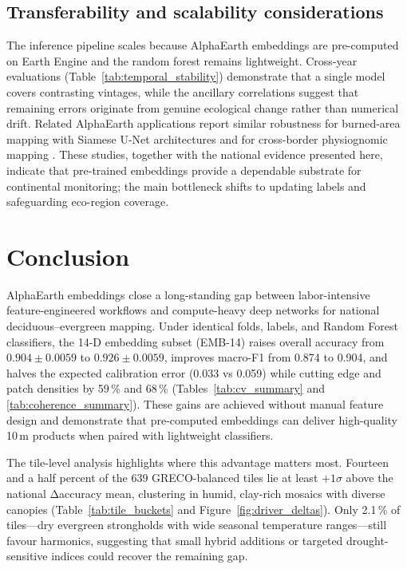 \documentclass[utf8]{FrontiersinHarvard}
\begin{document}
\subsection{Transferability and scalability considerations}
The inference pipeline scales because AlphaEarth embeddings are pre-computed on Earth Engine and the random forest remains lightweight. Cross-year evaluations (Table~\ref{tab:temporal_stability}) demonstrate that a single model covers contrasting vintages, while the ancillary correlations suggest that remaining errors originate from genuine ecological change rather than numerical drift. Related AlphaEarth applications report similar robustness for burned-area mapping with Siamese U-Net architectures \citep{Seydi2025AlphaEarthBurnedArea} and for cross-border physiognomic mapping \citep{Houriez2025AEFDataGen}. These studies, together with the national evidence presented here, indicate that pre-trained embeddings provide a dependable substrate for continental monitoring; the main bottleneck shifts to updating labels and safeguarding eco-region coverage.


\section{Conclusion}

AlphaEarth embeddings close a long-standing gap between labor-intensive feature-engineered workflows and compute-heavy deep networks for national deciduous–evergreen mapping. Under identical folds, labels, and Random Forest classifiers, the 14-D embedding subset (EMB-14) raises overall accuracy from $0.904 \pm 0.0059$ to $0.926 \pm 0.0059$, improves macro-F1 from 0.874 to 0.904, and halves the expected calibration error (0.033 vs 0.059) while cutting edge and patch densities by 59\,\% and 68\,\% (Tables~\ref{tab:cv_summary} and \ref{tab:coherence_summary}). These gains are achieved without manual feature design and demonstrate that pre-computed embeddings can deliver high-quality 10\,m products when paired with lightweight classifiers.

The tile-level analysis highlights where this advantage matters most. Fourteen and a half percent of the 639 GRECO-balanced tiles lie at least \(+1\sigma\) above the national Δaccuracy mean, clustering in humid, clay-rich mosaics with diverse canopies (Table~\ref{tab:tile_buckets} and Figure~\ref{fig:driver_deltas}). Only 2.1\,\% of tiles—dry evergreen strongholds with wide seasonal temperature ranges—still favour harmonics, suggesting that small hybrid additions or targeted drought-sensitive indices could recover the remaining gap.
\end{document}
